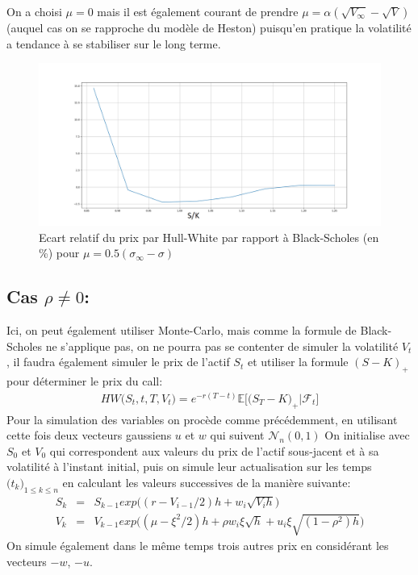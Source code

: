 \documentclass{report}
\begin{document}
On a choisi $\mu = 0$ mais il est également courant de prendre $\mu = \alpha(\sqrt{V_{\infty}}-\sqrt{V})$ (auquel cas on se rapproche du modèle de Heston) puisqu'en pratique la volatilité a tendance à se stabiliser sur le long terme.
\begin{figure}[H]
\begin{center}
\includegraphics[scale=0.3]{figure_3.png}
\end{center}
\caption{Ecart relatif du prix par Hull-White par rapport à Black-Scholes (en \%) pour $\mu = 0.5(\sigma_{\infty} - \sigma)$}
\end{figure} 


\subsection*{Cas $\rho \neq 0$:}
Ici, on peut également utiliser Monte-Carlo, mais comme la formule de Black-Scholes ne s'applique pas, on ne pourra pas se contenter de simuler la volatilité $V_t$, il faudra également simuler le prix de l'actif $S_t$ et utiliser la formule $(S - K)_+$ pour déterminer le prix du call:
\begin{eqnarray*}
HW\big(S_t, t, T, V_t\big) = e^{-r(T-t)}\mathbb{E}\Big[\big(S_T - K\big)_+\big| \mathcal{F}_t\Big]
\end{eqnarray*}
Pour la simulation des variables on procède comme précédemment, en utilisant cette fois deux vecteurs gaussiens $u$ et $w$ qui suivent $\mathcal{N}_n(0, 1)$
On initialise avec $S_0$ et $V_0$ qui correspondent aux valeurs du prix de l'actif sous-jacent et à sa volatilité à l'instant initial, puis on simule leur actualisation sur les temps $\big(t_k\big)_{1\leq k\leq n}$ en calculant les valeurs successives de la manière suivante:
\begin{eqnarray*}
S_k &=& S_{k-1}exp\big((r - V_{i-1}/2)h + w_i\sqrt{V_i h}\big)\\
V_k &=& V_{k-1}exp\big((\mu - \xi^2/2)h + \rho w_i \xi \sqrt{h} + u_i \xi\sqrt{(1-\rho^2) h}\big)
\end{eqnarray*}  
On simule également dans le même temps trois autres prix en considérant les vecteurs $-w$, $-u$.\\
\end{document}

